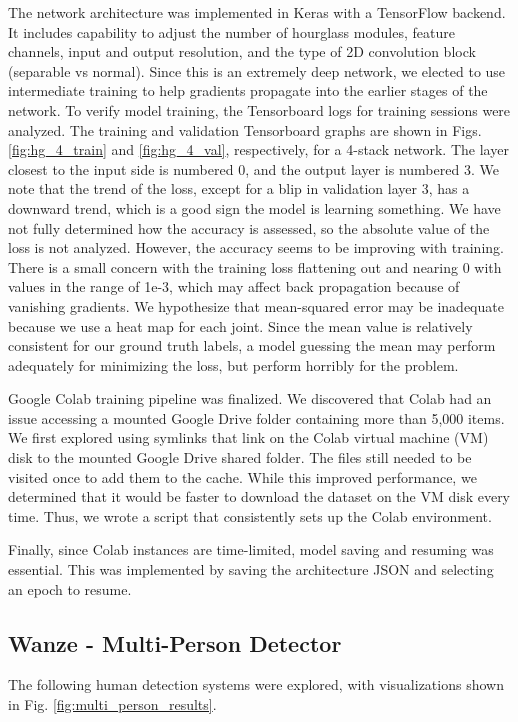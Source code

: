 \documentclass[11pt, letterpaper]{article}
\begin{document}
The network architecture was implemented in Keras with a TensorFlow backend. It includes capability to adjust the number of hourglass modules, feature channels, input and output resolution, and the type of 2D convolution block (separable vs normal). Since this is an extremely deep network, we elected to use intermediate training to help gradients propagate into the earlier stages of the network. To verify model training, the Tensorboard logs for training sessions were analyzed. The training and validation Tensorboard graphs are shown in Figs. \ref{fig:hg_4_train} and \ref{fig:hg_4_val}, respectively, for a 4-stack network. The layer closest to the input side is numbered 0, and the output layer is numbered 3. We note that the trend of the loss, except for a blip in validation layer 3, has a downward trend, which is a good sign the model is learning something. We have not fully determined how the accuracy is assessed, so the absolute value of the loss is not analyzed. However, the accuracy seems to be improving with training. There is a small concern with the training loss flattening out and nearing 0 with values in the range of 1e-3, which may affect back propagation because of vanishing gradients. We hypothesize that mean-squared error may be inadequate because we use a heat map for each joint. Since the mean value is relatively consistent for our ground truth labels, a model guessing the mean may perform adequately for minimizing the loss, but perform horribly for the problem.

Google Colab training pipeline was finalized. We discovered that Colab had an issue accessing a mounted Google Drive folder containing more than 5,000 items. We first explored using symlinks that link on the Colab virtual machine (VM) disk to the mounted Google Drive shared folder. The files still needed to be visited once to add them to the cache. While this improved performance, we determined that it would be faster to download the dataset on the VM disk every time. Thus, we wrote a script that consistently sets up the Colab environment.

Finally, since Colab instances are time-limited, model saving and resuming was essential. This was implemented by saving the architecture JSON and selecting an epoch to resume.


\subsection{Wanze - Multi-Person Detector}
The following human detection systems were explored, with visualizations shown in Fig. \ref{fig:multi_person_results}.
\end{document}
